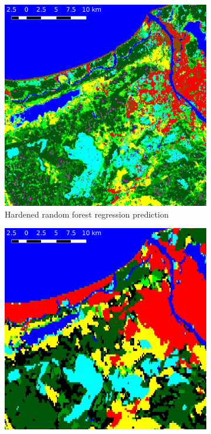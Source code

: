 \documentclass[a4paper,12pt]{scrbook}
\begin{document}
\begin{figure}
  \begin{subfigure}{0.48\textwidth}
    \centering
    \includegraphics[width=\textwidth]{thesis-figures/figures-qgis/riga-hard-rf}
    \caption{Hardened random forest regression prediction}
  \end{subfigure} \hfill
  \begin{subfigure}{0.48\textwidth}
    \centering
    \includegraphics[width=\textwidth]{thesis-figures/figures-qgis/riga-hard-cci}

\end{subfigure}
\end{figure}
\end{document}
